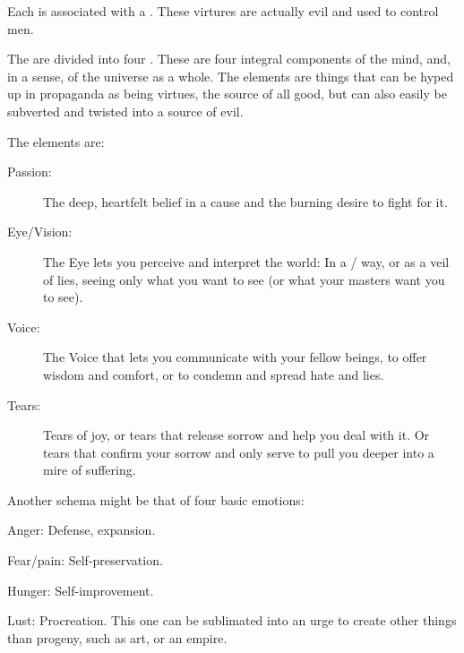 Each \Sephirah{} is associated with a . 
These virtures are actually evil and used to control men. 


The \Sephiroth{} are divided into four . These are four integral components of the mind, and, in a sense, of the universe as a whole. 
The elements are things that can be hyped up in propaganda as being virtues, the source of all good, but can also easily be subverted and twisted into a source of evil. 

The elements are: 

\begin{description}
  \item[Passion:] 
    The deep, heartfelt belief in a cause and the burning desire to fight for it. 
  \item[Eye/Vision:] 
    The Eye lets you perceive and interpret the world: In a / way, or as a veil of lies, seeing only what you want to see (or what your masters want you to see).
  \item[Voice:] 
    The Voice that lets you communicate with your fellow beings, to offer wisdom and comfort, or to condemn and spread hate and lies. 
  \item[Tears:] 
    Tears of joy, or tears that release sorrow and help you deal with it. Or tears that confirm your sorrow and only serve to pull you deeper into a mire of suffering. 
\end{description}

Another schema might be that of four basic emotions:

\begin{description}
  \item{Anger:} Defense, expansion.
  \item{Fear/pain:} Self-preservation.
  \item{Hunger:} Self-improvement.
  \item{Lust:} Procreation. This one can be sublimated into an urge to create other things than progeny, such as art, or an empire.
\end{description}








